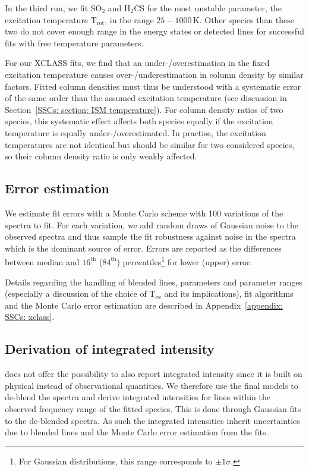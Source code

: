 In the third run, we fit SO$_2$ and H$_2$CS for the most unstable parameter, the excitation temperature $\mathrm{T_{rot}}$, in the range $25-1000$\,K. Other species than these two do not cover enough range in the energy states or detected lines for successful fits with free temperature parameters.

For our XCLASS fits, we find that an under-/overestimation in the fixed excitation temperature causes over-/underestimation in column density by similar factors. Fitted column densities must thus be understood with a systematic error of the same order than the assumed excitation temperature (see discussion in Section~\ref{SSCs: section: ISM temperature}). 
For column density ratios of two species, this systematic effect affects both species equally if the excitation temperature is equally under-/overestimated. In practise, the excitation temperatures are not identical but should be similar for two considered species, so their column density ratio is only weakly affected.

\subsection{Error estimation}
\label{SSCs: section: error estimation}

We estimate fit errors with a Monte Carlo scheme with 100 variations of the spectra to fit. For each variation, we add random draws of Gaussian noise to the observed spectra and thus sample the fit robustness against noise in the spectra which is the dominant source of error.
Errors are reported as the differences between median and $16^\mathrm{th}$ ($84^\mathrm{th}$) percentiles\footnote{For Gaussian distributions, this range corresponds to $\pm1\sigma$.} for lower (upper) error.

Details regarding the handling of blended lines, parameters and parameter ranges (especially a discussion of the choice of $\mathrm{T_{ex}}$ and its implications), fit algorithms and the Monte Carlo error estimation are described in Appendix~\ref{appendix: SSCs: xclass}.

\subsection{Derivation of integrated intensity}
\xclass does not offer the possibility to also report integrated intensity since it is built on physical instead of observational quantities. We therefore use the final \xclass models to de-blend the spectra and derive integrated intensities for lines within the observed frequency range of the fitted species. This is done through Gaussian fits to the de-blended spectra. As such the integrated intensities inherit uncertainties due to blended lines and the Monte Carlo error estimation from the \xclass fits.


